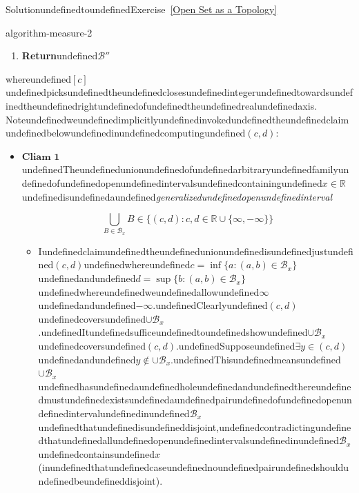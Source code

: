 \begin{mystsolution}{SolutionundefinedtoundefinedExercise~\ref{Open Set as a Topology}}
\begin{mystthmalgorithm}{}{algorithm-measure-2}
\begin{enumerate}
\begin{enumerate}
\item \textbf{Else}
Otherundefinedcasesundefinedfollowsundefinedasundefined(3)
\item $\mathcal B'' = \mathcal B'' \cup \mathcal B_x '$
\end{enumerate}


\item \textbf{Return}undefined$\mathcal B''$
\end{enumerate}

\end{mystthmalgorithm}
whereundefined$[c]$undefinedpicksundefinedtheundefinedclosesundefinedintegerundefinedtowardsundefinedtheundefinedrightundefinedofundefinedtheundefinedrealundefinedaxis.
Noteundefinedweundefinedimplicitlyundefinedinvokedundefinedtheundefinedclaimundefinedbelowundefinedinundefinedcomputingundefined$(c,d)$:

\begin{itemize}
\item $\boxed{\textbf{Cliam 1}}$undefinedTheundefinedunionundefinedofundefinedarbitraryundefinedfamilyundefinedofundefinedopenundefinedintervalsundefinedcontainingundefined$x\in \mathbb{R}$undefinedisundefinedaundefined\textit{generalizedundefinedopenundefinedinterval}

\begin{equation}
\bigcup_{B\in \mathcal B_x} B\in \{(c,d): c,d\in \mathbb{R}\cup \{\infty, -\infty\}\}
\end{equation}

\begin{itemize}
\item Iundefinedclaimundefinedtheundefinedunionundefinedisundefinedjustundefined$(c,d)$undefinedwhereundefined$c=\inf \{a:(a,b)\in \mathcal B_x\}$undefinedandundefined$d=\sup \{b:(a,b)\in \mathcal B_x\}$undefinedwhereundefinedweundefinedallowundefined$\infty$undefinedandundefined$-\infty$.undefinedClearlyundefined$(c,d)$undefinedcoversundefined$\cup \mathcal B_x$.undefinedItundefinedsufficeundefinedtoundefinedshowundefined$\cup \mathcal B_x$undefinedcoversundefined$(c,d)$.undefinedSupposeundefined$\exists y \in (c,d)$undefinedandundefined$y\notin \cup \mathcal B_x$.undefinedThisundefinedmeansundefined$\cup \mathcal B_x$undefinedhasundefinedaundefinedholeundefinedandundefinedthereundefinedmustundefinedexistsundefinedaundefinedpairundefinedofundefinedopenundefinedintervalundefinedinundefined$\mathcal B_x$undefinedthatundefinedisundefineddisjoint,undefinedcontradictingundefinedthatundefinedallundefinedopenundefinedintervalsundefinedinundefined$\mathcal B_x$undefinedcontainsundefined$x$(inundefinedthatundefinedcaseundefinednoundefinedpairundefinedshouldundefinedbeundefineddisjoint).
\end{itemize}
\end{itemize}


\end{mystsolution}
